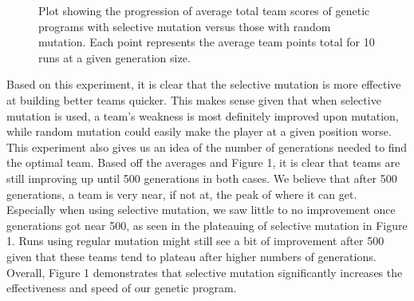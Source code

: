 \begin{figure}
\centering
\caption{Plot showing the progression of average total team scores of genetic programs with selective mutation versus those with random mutation. Each point represents the average team points total for 10 runs at a given generation size.}
\end{figure}





Based on this experiment, it is clear that the selective mutation is more effective at building better teams quicker. This makes sense given that when selective mutation is used, a team's weakness is most definitely improved upon mutation, while random mutation could easily make the player at a given position worse. This experiment also gives us an idea of the number of generations needed to find the optimal team. Based off the averages and Figure 1, it is clear that teams are still improving up until 500 generations in both cases. We believe that after 500 generations, a team is very near, if not at, the peak of where it can get. Especially when using selective mutation, we saw little to no improvement once generations got near 500, as seen in the plateauing of selective mutation in Figure 1. Runs using regular mutation might still see a bit of improvement after 500 given that these teams tend to plateau after higher numbers of generations. Overall, Figure 1 demonstrates that selective mutation significantly increases the effectiveness and speed of our genetic program.
